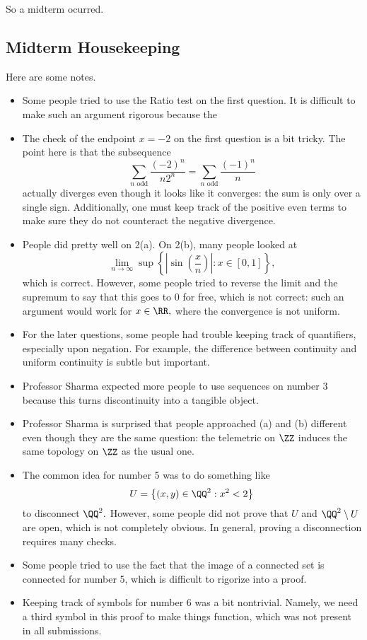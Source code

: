 














So a midterm ocurred.

\subsection{Midterm Housekeeping}
Here are some notes.
\begin{itemize}
	\item Some people tried to use the Ratio test on the first question. It is difficult to make such an argument rigorous because the 
	\item The check of the endpoint $x=-2$ on the first question is a bit tricky. The point here is that the subsequence
	\[\sum_{n\text{ odd}}\frac{(-2)^n}{n2^n}=\sum_{n\text{ odd}}\frac{(-1)^n}n\]
	actually diverges even though it looks like it converges: the sum is only over a single sign. Additionally, one must keep track of the positive even terms to make sure they do not counteract the negative divergence.
	\item People did pretty well on 2(a). On 2(b), many people looked at
	\[\lim_{n\to\infty}\sup\left\{\left|\sin\left(\frac xn\right)\right|:x\in[0,1]\right\},\]
	which is correct. However, some people tried to reverse the limit and the supremum to say that this goes to $0$ for free, which is not correct: such an argument would work for $x\in\RR,$ where the convergence is not uniform.
	\item For the later questions, some people had trouble keeping track of quantifiers, especially upon negation. For example, the difference between continuity and uniform continuity is subtle but important.
	\item Professor Sharma expected more people to use sequences on number 3 because this turns discontinuity into a tangible object.
	\item Professor Sharma is surprised that people approached (a) and (b) different even though they are the same question: the telemetric on $\ZZ$ induces the same topology on $\ZZ$ as the usual one.
	\item The common idea for number 5 was to do something like
	\[U=\left\{(x,y)\in\QQ^2:x^2<2\right\}\]
	to disconnect $\QQ^2.$ However, some people did not prove that $U$ and $\QQ^2\setminus U$ are open, which is not completely obvious. In general, proving a disconnection requires many checks.
	\item Some people tried to use the fact that the image of a connected set is connected for number 5, which is difficult to rigorize into a proof.
	\item Keeping track of symbols for number 6 was a bit nontrivial. Namely, we need a third symbol in this proof to make things function, which was not present in all submissions.
\end{itemize}
